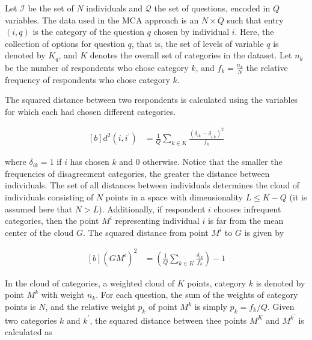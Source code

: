 \documentclass[conference,final,]{IEEEtran}
\begin{document}
Let \(\mathcal{I}\) be the set of \(N\) individuals and \(\mathcal{Q}\)
the set of questions, encoded in \(Q\) variables. The data used in the
MCA approach is an \(N \times Q\) such that entry \((i, q)\) is the
category of the question \(q\) chosen by individual \(i\). Here, the
collection of options for question \(q\), that is, the set of levels of
variable \(q\) is denoted by \(K_q\), and \(K\) denotes the overall set
of categories in the dataset. Let \(n_k\) be the number of respondents
who chose category \(k\), and \(f_k = \frac{n_k}{N}\) the relative
frequency of respondents who chose category \(k\).

The squared distance between two respondents is calculated using the
variables for which each had chosen different categories.

\begin{equation}
\begin{aligned}[b]
\label{eq:distInd}
d^2(i, i^{\prime}) &= \frac{1}{Q} \sum_{k\in K} \frac{(\delta_{ik} - \delta_{i^{\prime}k})^2}{f_k}  
\end{aligned}
\end{equation}

where \(\delta_{ik} = 1\) if \(i\) has chosen \(k\) and \(0\) otherwise.
Notice that the smaller the frequencies of disagreement categories, the
greater the distance between individuals. The set of all distances
between individuals determines the cloud of individuals consisting of
\(N\) points in a space with dimensionality \(L\leq K - Q\)
\cite{greenacre2006multiple} (it is assumed here that \(N > L\)).
Additionally, if respondent \(i\) chooses infrequent categories, then
the point \(M^i\) representing individual \(i\) is far from the mean
center of the cloud \(G\). The squared distance from point \(M^i\) to
\(G\) is given by

\begin{equation}
\begin{aligned}[b]
\label{eq:distGM}
(GM^i)^2 &= \left( \frac{1}{Q} \sum_{k\in K} \frac{\delta_{ik}}{f_k}  \right) -1
\end{aligned}
\end{equation}

In the cloud of categories, a weighted cloud of \(K\) points, category
\(k\) is denoted by point \(M^k\) with weight \(n_k.\) For each
question, the sum of the weights of category points is \(N\), and the
relative weight \(p_k\) of point \(M^k\) is simply \(p_k = f_k / Q\).
Given two categories \(k\) and \(k^{\prime}\), the squared distance
between thee points \(M^K\) and \(M^{k^{\prime}}\) is calculated as
\end{document}
